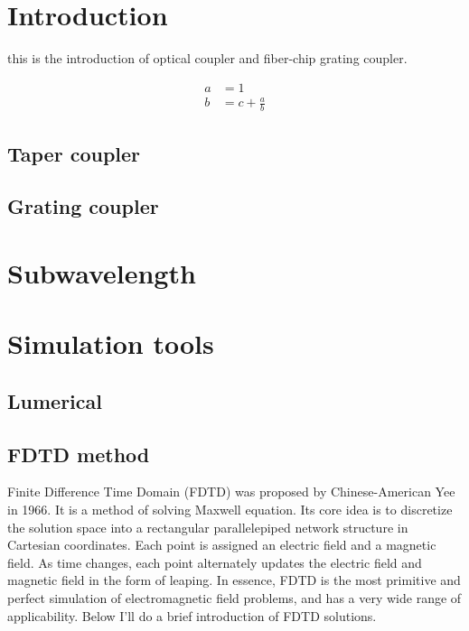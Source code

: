 \documentclass[]{article}
\begin{document}
\newpage


\tableofcontents

\newpage


\section{Introduction}
this is the introduction of optical coupler and fiber-chip grating coupler.

\begin{align*}
	a &= 1\\
	b &= c + \frac{a}{b} 
\end{align*}  


\subsection{Taper coupler}

\subsection{Grating coupler}

\section{Subwavelength}

\section{Simulation tools}
\subsection{Lumerical}

\subsection{FDTD method}
Finite Difference Time Domain (FDTD) was proposed by Chinese-American Yee in 1966. It is a method of solving Maxwell equation. Its core idea is to discretize the solution space into a rectangular parallelepiped network structure in Cartesian coordinates. Each point is assigned an electric field and a magnetic field. As time changes, each point alternately updates the electric field and magnetic field in the form of leaping. In essence, FDTD is the most primitive and perfect simulation of electromagnetic field problems, and has a very wide range of applicability. Below I'll do a brief introduction of FDTD solutions.
\end{document}
